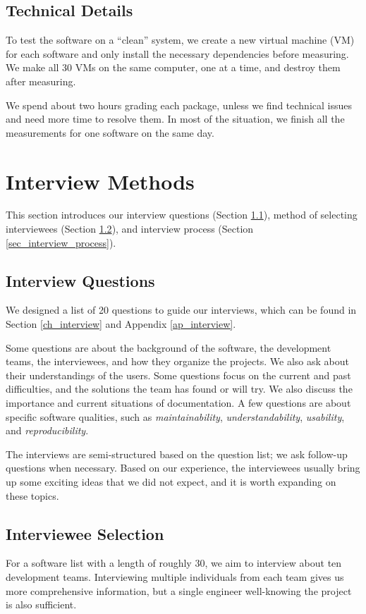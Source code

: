 \subsection{Technical Details}
\label{sec_technical_details}
To test the software on a ``clean'' system, we create a new virtual machine (VM) for each software and only install the necessary dependencies before measuring. We make all 30 VMs on the same computer, one at a time, and destroy them after measuring.

We spend about two hours grading each package, unless we find technical issues and need more time to resolve them. In most of the situation, we finish all the measurements for one software on the same day.

\section{Interview Methods}
\label{sec_interview_methods}

This section introduces our interview questions (Section \ref{sec_interview_questions}), method of selecting interviewees (Section \ref{sec_interviewee_selection}), and interview process (Section \ref{sec_interview_process}).

\subsection{Interview Questions}
\label{sec_interview_questions}
We designed a list of 20 questions to guide our interviews, which can be found in Section \ref{ch_interview} and Appendix \ref{ap_interview}.

Some questions are about the background of the software, the development teams, the interviewees, and how they organize the projects. We also ask about their understandings of the users. Some questions focus on the current and past difficulties, and the solutions the team has found or will try. We also discuss the importance and current situations of documentation. A few questions are about specific software qualities, such as \textit{maintainability}, \textit{understandability}, \textit{usability}, and \textit{reproducibility}.

The interviews are semi-structured based on the question list; we ask follow-up questions when necessary. Based on our experience, the interviewees usually bring up some exciting ideas that we did not expect, and it is worth expanding on these topics.

\subsection{Interviewee Selection}
\label{sec_interviewee_selection}
For a software list with a length of roughly 30, we aim to interview about ten development teams. Interviewing multiple individuals from each team gives us more comprehensive information, but a single engineer well-knowing the project is also sufficient.

